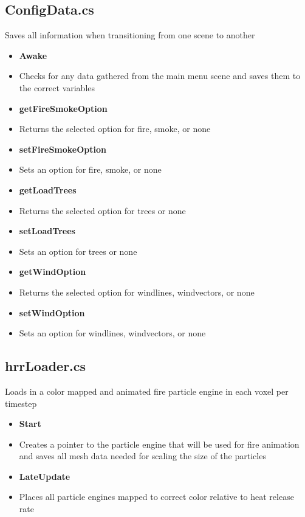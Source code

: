 \subsection{ConfigData.cs}
 Saves all information when transitioning from one scene to another 
\begin{itemize}
    \item \textbf{Awake} 
    \item[]Checks for any data gathered from the main menu scene and saves them to the correct variables

    \item \textbf{getFireSmokeOption} 
    \item[] Returns the selected option for fire, smoke, or none

    \item \textbf{setFireSmokeOption} 
    \item[] Sets an option for fire, smoke, or none


    \item \textbf{getLoadTrees}
    \item[] Returns the selected option for trees or none

    \item \textbf{setLoadTrees}
    \item[] Sets an option for trees or none

    \item \textbf{getWindOption}
    \item[] Returns the selected option for windlines, windvectors, or none

    \item \textbf{setWindOption} 
    \item[] Sets an option for  windlines, windvectors, or none
\end{itemize}

\subsection{hrrLoader.cs}
Loads in a color mapped and animated fire particle engine in each voxel per timestep
\begin{itemize}
    \item \textbf{Start}
    \item[] Creates a pointer to the particle engine that will be used for fire animation and saves all mesh data needed for scaling the size of the particles

    \item \textbf{LateUpdate} 
    \item[] Places all particle engines mapped to correct color relative to heat release rate
\end{itemize}
        

